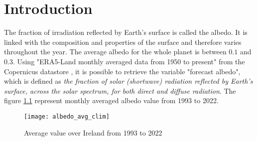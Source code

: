 \chapter{Introduction}



The fraction of irradiation reflected by Earth's surface is called the albedo. It is linked with the composition and properties of the surface and therefore varies throughout the year. The average albedo for the whole planet is between $0.1$ and $0.3$. Using "ERA5-Land monthly averaged data from 1950 to present" from the Copernicus datastore \citep{hersbach2020era5}, it is possible to retrieve the variable "forecast albedo", which is defined as \textit{the fraction of solar (shortwave) radiation reflected by Earth's surface, across the solar spectrum, for both direct and diffuse radiation}. The figure \ref{fig:avg_albedo} represent monthly averaged albedo value from 1993 to 2022. 

\begin{figure}[ht]
	\centering
	\texttt{[image: albedo\_avg\_clim]}
	\caption{Average value over Ireland from 1993 to 2022}
	\label{fig:avg_albedo}
\end{figure}



